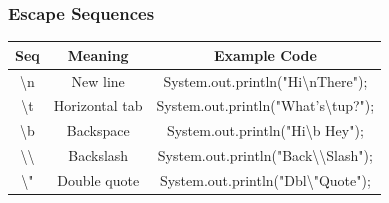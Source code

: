 \documentclass{beamer}
\begin{document}
\begin{frame}[fragile]
  \frametitle{Escape Sequences}
\begin{tabular}{|c|c|c|}
\hline
Seq &	Meaning	&	    Example Code \\
\hline
\textbackslash n	& New line		&    System.out.println("Hi\textbackslash nThere"); \\

\textbackslash t	&Horizontal tab	& System.out.println("What's\textbackslash tup?"); \\

\textbackslash b &	Backspace	  &  System.out.println("Hi\textbackslash b Hey"); \\

\textbackslash\textbackslash &	Backslash	 &   System.out.println("Back\textbackslash\textbackslash Slash"); \\

\textbackslash "	 &Double quote	&    System.out.println("Dbl\textbackslash "Quote"); \\
\hline
\end{tabular}

\end{frame}

\end{document}

